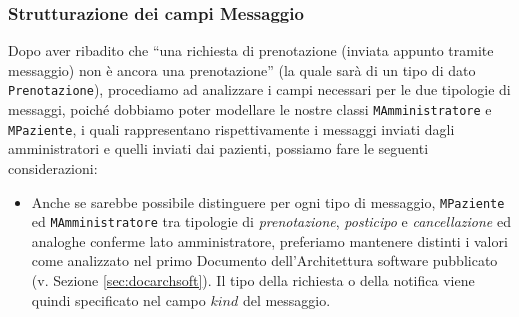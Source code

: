 \subsubsection{Strutturazione dei campi Messaggio}
Dopo aver ribadito che ``una richiesta di prenotazione (inviata appunto tramite
messaggio) non è ancora una prenotazione'' (la quale sarà di un tipo di dato
\texttt{Prenotazione}), procediamo ad analizzare 
i campi necessari per le due tipologie di messaggi,
poiché dobbiamo poter modellare le nostre classi \texttt{MAmministratore} e
\texttt{MPaziente}, i quali rappresentano rispettivamente i messaggi inviati
dagli amministratori e quelli inviati dai pazienti, possiamo fare le seguenti
considerazioni:
\begin{itemize}
\item Anche se sarebbe possibile distinguere per ogni tipo di messaggio, \texttt{MPaziente}
	ed \texttt{MAmministratore} tra tipologie di \textit{prenotazione}, \textit{posticipo} e
	\textit{cancellazione} ed analoghe conferme lato amministratore, preferiamo
	mantenere distinti i valori come analizzato nel primo Documento
	dell'Architettura software pubblicato (v. Sezione \vref{sec:docarchsoft}).
	Il tipo della richiesta o della notifica viene quindi specificato nel 
	campo $kind$ del messaggio.
\end{itemize}
